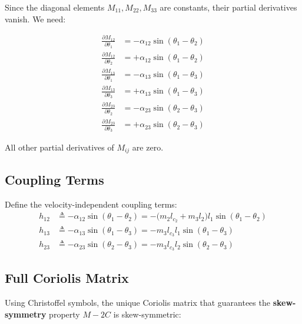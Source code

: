 \documentclass[11pt,a4paper]{article}
\newcommand{\vc}[1]{\bm{#1}}
\newcommand{\mat}[1]{\bm{#1}}
\newcommand{\dt}[1]{\dot{#1}}
\newcommand{\pder}[2]{\frac{\partial #1}{\partial #2}}
\def\vc#1{#1}%
\def\mat#1{#1}%
\def\dt#1{#1}%
\def\bm#1{#1}%
\begin{document}
Since the diagonal elements $M_{11}, M_{22}, M_{33}$ are constants, their
partial derivatives vanish. We need:

\begin{align}
    \pder{M_{12}}{\theta_1} &= -\alpha_{12} \sin(\theta_1 - \theta_2) \label{eq:dM12dq1} \\
    \pder{M_{12}}{\theta_2} &= +\alpha_{12} \sin(\theta_1 - \theta_2) \label{eq:dM12dq2} \\
    \pder{M_{13}}{\theta_1} &= -\alpha_{13} \sin(\theta_1 - \theta_3) \label{eq:dM13dq1} \\
    \pder{M_{13}}{\theta_3} &= +\alpha_{13} \sin(\theta_1 - \theta_3) \label{eq:dM13dq3} \\
    \pder{M_{23}}{\theta_2} &= -\alpha_{23} \sin(\theta_2 - \theta_3) \label{eq:dM23dq2} \\
    \pder{M_{23}}{\theta_3} &= +\alpha_{23} \sin(\theta_2 - \theta_3) \label{eq:dM23dq3}
\end{align}

All other partial derivatives of $M_{ij}$ are zero.

\subsection{Coupling Terms}

Define the velocity-independent coupling terms:
\begin{equation}
\boxed{
\begin{aligned}
    h_{12} &\triangleq -\alpha_{12} \sin(\theta_1 - \theta_2)
             = -\bigl(m_2 l_{c_2} + m_3 l_2\bigr) l_1 \sin(\theta_1 - \theta_2) \\
    h_{13} &\triangleq -\alpha_{13} \sin(\theta_1 - \theta_3)
             = -m_3 l_{c_3} l_1 \sin(\theta_1 - \theta_3) \\
    h_{23} &\triangleq -\alpha_{23} \sin(\theta_2 - \theta_3)
             = -m_3 l_{c_3} l_2 \sin(\theta_2 - \theta_3)
\end{aligned}
}
\label{eq:h_defs}
\end{equation}

\subsection{Full Coriolis Matrix}

Using Christoffel symbols, the unique Coriolis matrix that guarantees the
\textbf{skew-symmetry} property $\dt{\mat{M}} - 2\vc{C}$ is skew-symmetric:
\end{document}
